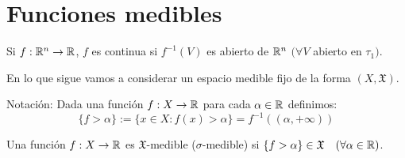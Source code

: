 \section{Funciones medibles}

\begin{prop}
    Si $f: \mathbb{R}^n \to \mathbb{R}$, $f$ es continua si $f^{-1}(V)$ es abierto de $ \mathbb{R}^n$ $(\forall V$ abierto en $\tau_1)$.
\end{prop}
En lo que sigue vamos a considerar un espacio medible fijo de la forma $(X, \mathfrak{X})$.

Notación: Dada una función $f: X \to \mathbb{R}$ para cada $\alpha \in \mathbb{R}$ definimos: \begin{equation}
    \{ f > \alpha \} := \{ x \in X : f(x) > \alpha \} = f^{-1}((\alpha, +\infty))
\end{equation}

\begin{definition}
    Una función $f: X \to \mathbb{R}$ es $\mathfrak{X}$-medible ($ \sigma $-medible) si $\{ f > \alpha \} \in \mathfrak{X} \quad (\forall \alpha \in \mathbb{R})$.
\end{definition}

\clearpage

